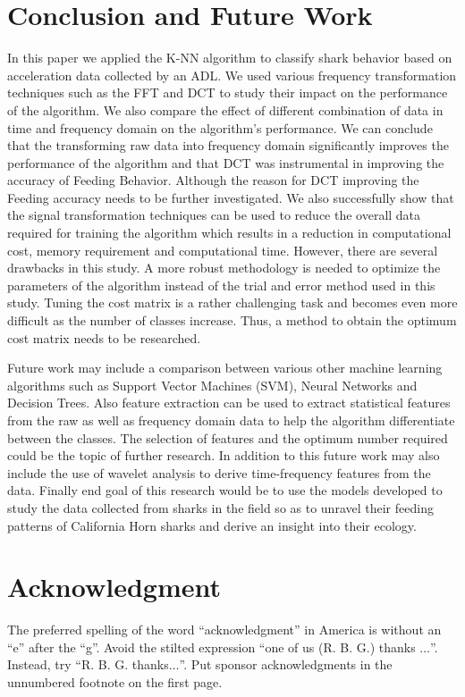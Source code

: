 \documentclass[conference]{IEEEtran}
\begin{document}
\section{Conclusion and Future Work}
In this paper we applied the K-NN algorithm to classify shark behavior based on acceleration data collected by an ADL. We used various frequency transformation techniques such as the FFT and DCT to study their impact on the performance of the algorithm. We also compare the effect of different combination of data in time and frequency domain on the algorithm’s performance. We can conclude that the transforming raw data into frequency domain significantly improves the performance of the algorithm and that DCT was instrumental in improving the accuracy of Feeding Behavior. Although the reason for DCT improving the Feeding accuracy needs to be further investigated. We also successfully show that the signal transformation techniques can be used to reduce the overall data required for training the algorithm which results in a reduction in computational cost, memory requirement and computational time. However, there are several drawbacks in this study. A more robust methodology is needed to optimize the parameters of the algorithm instead of the trial and error method used in this study. Tuning the cost matrix is a rather challenging task and becomes even more difficult as the number of classes increase. Thus, a method to obtain the optimum cost matrix needs to be researched.

Future work may include a comparison between various other machine learning algorithms such as Support Vector Machines (SVM), Neural Networks and Decision Trees. Also feature extraction can be used to extract statistical features from the raw as well as frequency domain data to help the algorithm differentiate between the classes. The selection of features and the optimum number required could be the topic of further research. In addition to this future work may also include the use of wavelet analysis to derive time-frequency features from the data. Finally end goal of this research would be to use the models developed to study the data collected from sharks in the field so as to unravel their feeding patterns of California Horn sharks and derive an insight into their ecology.

\section*{Acknowledgment}

The preferred spelling of the word ``acknowledgment'' in America is without 
an ``e'' after the ``g''. Avoid the stilted expression ``one of us (R. B. 
G.) thanks $\ldots$''. Instead, try ``R. B. G. thanks$\ldots$''. Put sponsor 
acknowledgments in the unnumbered footnote on the first page.
\end{document}
